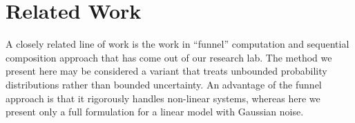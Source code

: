 \documentclass{llncs}
\begin{document}
%
%
%
%
%
%
%

%
\section{Related Work}

A closely related line of work is the work in ``funnel'' computation and sequential composition approach that has come out of our research lab.  The method we present here may be considered a variant that treats unbounded probability distributions rather than bounded uncertainty.  An advantage of the funnel approach is that it rigorously handles non-linear systems, whereas here we present only a full formulation for a linear model with Gaussian noise.
\end{document}
